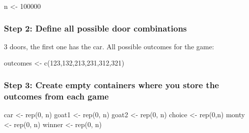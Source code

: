 \documentclass[
]{book}
\newenvironment{Shaded}{\begin{snugshade}}{\end{snugshade}}
\newcommand{\DecValTok}[1]{\textcolor[rgb]{0.00,0.00,0.81}{#1}}
\newcommand{\FunctionTok}[1]{\textcolor[rgb]{0.00,0.00,0.00}{#1}}
\newcommand{\NormalTok}[1]{#1}
\newcommand{\OtherTok}[1]{\textcolor[rgb]{0.56,0.35,0.01}{#1}}
\theoremstyle{definition}
\theoremstyle{definition}
\theoremstyle{definition}
\theoremstyle{definition}
\theoremstyle{remark}
\begin{document}
\begin{Shaded}
\begin{Highlighting}[]
\NormalTok{n }\OtherTok{\textless{}{-}} \DecValTok{100000}
\end{Highlighting}
\end{Shaded}

\hypertarget{step-2-define-all-possible-door-combinations}{%
\subsubsection*{Step 2: Define all possible door combinations}\label{step-2-define-all-possible-door-combinations}}

3 doors, the first one has the car. All possible outcomes for the game:

\begin{Shaded}
\begin{Highlighting}[]
\NormalTok{outcomes }\OtherTok{\textless{}{-}} \FunctionTok{c}\NormalTok{(}\DecValTok{123}\NormalTok{,}\DecValTok{132}\NormalTok{,}\DecValTok{213}\NormalTok{,}\DecValTok{231}\NormalTok{,}\DecValTok{312}\NormalTok{,}\DecValTok{321}\NormalTok{)}
\end{Highlighting}
\end{Shaded}

\hypertarget{step-3-create-empty-containers-where-you-store-the-outcomes-from-each-game}{%
\subsubsection*{Step 3: Create empty containers where you store the outcomes from each game}\label{step-3-create-empty-containers-where-you-store-the-outcomes-from-each-game}}

\begin{Shaded}
\begin{Highlighting}[]
\NormalTok{car }\OtherTok{\textless{}{-}} \FunctionTok{rep}\NormalTok{(}\DecValTok{0}\NormalTok{, n)}
\NormalTok{goat1 }\OtherTok{\textless{}{-}} \FunctionTok{rep}\NormalTok{(}\DecValTok{0}\NormalTok{, n)}
\NormalTok{goat2 }\OtherTok{\textless{}{-}} \FunctionTok{rep}\NormalTok{(}\DecValTok{0}\NormalTok{, n)}
\NormalTok{choice }\OtherTok{\textless{}{-}} \FunctionTok{rep}\NormalTok{(}\DecValTok{0}\NormalTok{,n)}
\NormalTok{monty }\OtherTok{\textless{}{-}} \FunctionTok{rep}\NormalTok{(}\DecValTok{0}\NormalTok{, n)}
\NormalTok{winner }\OtherTok{\textless{}{-}} \FunctionTok{rep}\NormalTok{(}\DecValTok{0}\NormalTok{, n)}
\end{Highlighting}
\end{Shaded}
\end{document}
